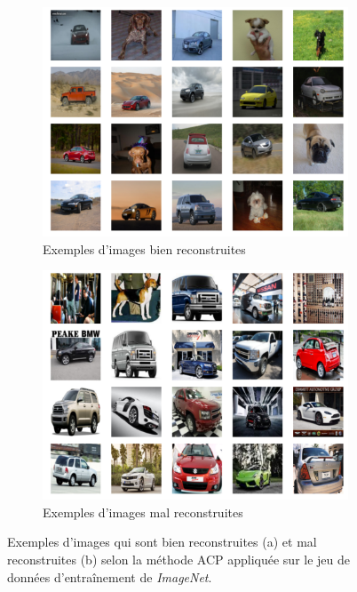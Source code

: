 \begin{figure}[H]
	\centering
	\begin{subfigure}{12cm}
		\centering\includegraphics[width=12cm]{images/smallest_errors}
		\caption{Exemples d'images bien reconstruites}
		\label{fig:acp_reconstructionsa}
	\end{subfigure}
	\begin{subfigure}{12cm}
		\centering\includegraphics[width=12cm]{images/biggest_errors}
		\caption{Exemples d'images mal reconstruites}
		\label{fig:acp_reconstructionsb}
	\end{subfigure}
	\caption{Exemples d'images qui sont bien reconstruites (a) et mal reconstruites (b) selon la méthode ACP appliquée sur le jeu de données d'entraînement de \textit{ImageNet}.}
	\label{fig:acp_reconstructions}
\end{figure}

